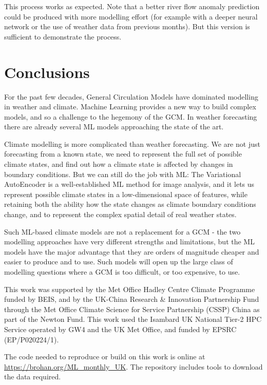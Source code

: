 \documentclass{ametsocV6.1}
\begin{document}
This process works as expected. Note that a better river flow anomaly prediction could be produced with more modelling effort (for example with a deeper neural network or the use of weather data from previous months). But this version is sufficient to demonstrate the process.


\section{Conclusions}

For the past few decades, General Circulation Models have dominated modelling in weather and climate. Machine Learning provides a new way to build complex models, and so a challenge to the hegemony of the GCM. In weather forecasting there are already several ML models approaching the state of the art. 

Climate modelling is more complicated than weather forecasting. We are not just forecasting from a known state, we need to represent the full set of possible climate states, and find out how a climate state is affected by changes in boundary conditions. But we can still do the job with ML: The Variational AutoEncoder is a well-established ML method for image analysis, and it lets us represent possible climate states in a low-dimensional space of features, while retaining both the ability how the state changes as climate boundary conditions change, and to represent the complex spatial detail of real weather states.

Such ML-based climate models are not a replacement for a GCM - the two modelling approaches have very different strengths and limitations, but the ML models have the major advantage that they are orders of magnitude cheaper and easier to produce and to use. Such models will open up the large class of modelling questions where a GCM is too difficult, or too expensive, to use.

\acknowledgments
This work was supported by the Met Office Hadley Centre Climate Programme funded by BEIS, and by the UK-China Research \& Innovation Partnership Fund through the Met Office Climate Science for Service Partnership (CSSP) China as part of the Newton Fund.
This work used the Isambard UK National Tier-2 HPC Service operated by GW4 and the UK Met Office, and funded by EPSRC (EP/P020224/1).

\datastatement
The code needed to reproduce or build on this work is online at \url{https://brohan.org/ML_monthly_UK}. The repository includes tools to download the data required. 






\end{document}

